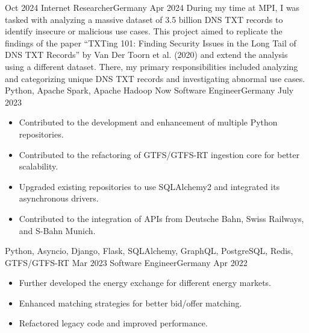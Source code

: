 %
%
%

\begin{experiences}
  \experience
    {Oct 2024} {Internet Researcher}{}{Germany}
    {Apr 2024} {
      During my time at MPI, I was tasked with analyzing a massive dataset of 3.5 billion DNS TXT records to identify insecure or malicious use cases. This project aimed to replicate the findings of the paper “TXTing 101: Finding Security Issues in the Long Tail of DNS TXT Records” by Van Der Toorn et al. (2020) and extend the analysis using a different dataset. There, my primary responsibilities included analyzing and categorizing unique DNS TXT records and investigating abnormal use cases.
    }
    {Python, Apache Spark, Apache Hadoop}
  \emptySeparator
  \experience
    {Now} {Software Engineer}{}{Germany}
    {July 2023} {
      \begin{itemize}
        \item Contributed to the development and enhancement of multiple Python repositories.
        \item Contributed to the refactoring of GTFS/GTFS-RT ingestion core for better scalability.
        \item Upgraded existing repositories to use SQLAlchemy2 and integrated its asynchronous drivers.
        \item Contributed to the integration of APIs from Deutsche Bahn, Swiss Railways, and S-Bahn Munich.
      \end{itemize}
    }
    {Python, Asyncio, Django, Flask, SQLAlchemy, GraphQL, PostgreSQL, Redis, GTFS/GTFS-RT}
  \emptySeparator
  \experience
  {Mar 2023} {Software Engineer}{}{Germany}
  {Apr 2022} {
    \begin{itemize}
      \item Further developed the energy exchange for different energy markets.
      \item Enhanced matching strategies for better bid/offer matching.
      \item Refactored legacy code and improved performance.

\end{itemize}}
\end{experiences}
